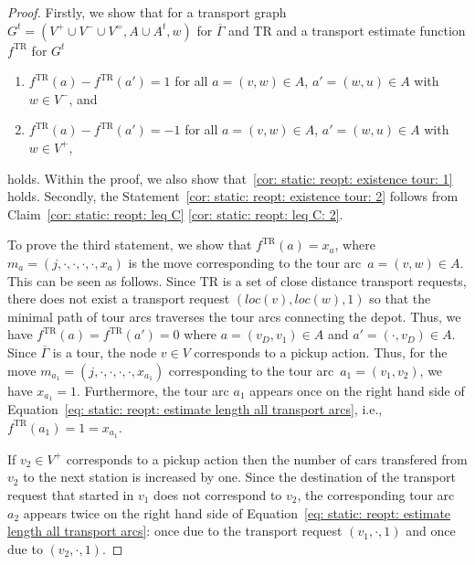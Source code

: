 \documentclass[english]{llncs}
\numberwithin{sublemma}{lemma}
\newcommand{\aloc}{\ensuremath{loc}}
\newcommand{\tourd}{\ensuremath{\Gamma}}
\newcommand{\move}{\ensuremath{m}}
\newcommand{\TR}{\mathrm{TR}}
\newcommand{\Vpick}{{V^+}}
\newcommand{\Vdrop}{{V^-}}
\newcommand{\Vbal}{{V^=}}
\begin{document}
\begin{proof}
Firstly, we show that for a transport graph $G^t = (\Vpick \cup \Vdrop \cup \Vbal, A \cup A^t, w)$ for $\overline{\tourd}$ and $\TR$ and a transport estimate function $f^{\TR}$ for $G^t$ \begin{enumerate}[label=(\alph*),ref=(\alph*)]
      \item \label{lem: static: reopt: existence tour: iii: i} $f^{\TR}(a) - f^{\TR}(a') = 1$ for all $a = (v, w) \in A$, $a' = (w, u) \in A$ with $w \in \Vdrop$, and
      \item \label{lem: static: reopt: existence tour: iii: ii} $f^{\TR}(a) - f^{\TR}(a') = -1$ for all $a = (v, w) \in A$, $a' = (w, u) \in A$ with $w \in \Vpick$,
  \end{enumerate}
holds.
Within the proof, we also show that~\ref{cor: static: reopt: existence tour: 1} holds.
Secondly, the Statement~\ref{cor: static: reopt: existence tour: 2} follows from Claim~\ref{cor: static: reopt: leq C} \ref{cor: static: reopt: leq C: 2}.




To prove the third statement, we show that $f^{\TR}(a) = x_a$, where $\move_a = (j, \cdot, \cdot, \cdot, \cdot, x_a)$ is the move corresponding to the tour arc~$a = (v, w) \in A$.
This can be seen as follows.
Since $\TR$ is a set of close distance transport requests, there does not exist a transport request $(\aloc(v), \aloc(w), 1)$ so that the minimal path of tour arcs traverses the tour arcs connecting the depot.
Thus, we have $f^\TR(a) = f^\TR(a') = 0$ where $a = (v_D, v_1) \in A$ and $a' = (\cdot, v_D) \in A$.
Since $\overline{\tourd}$ is a tour, the node $v \in V$ corresponds to a pickup action.
Thus, for the move $\move_{a_1} = (j, \cdot, \cdot, \cdot, \cdot, x_{a_1})$ corresponding to the tour arc~$a_1 = (v_1, v_2)$, we have $x_{a_1} = 1$.
Furthermore, the tour arc $a_1$ appears once on the right hand side of Equation~\eqref{eq: static: reopt: estimate length all transport arcs}, i.e., $f^\TR(a_1) = 1 = x_{a_1}$.

If $v_2 \in \Vpick$ corresponds to a pickup action then the number of cars transfered from $v_2$ to the next station is increased by one.
Since the destination of the transport request that started in $v_1$ does not correspond to $v_2$,
the corresponding tour arc $a_2$ appears twice on the right hand side of Equation~\eqref{eq: static: reopt: estimate length all transport arcs}:
once due to the transport request $(v_1, \cdot, 1)$ and once due to $(v_2, \cdot, 1)$.


\end{proof}
\end{document}
